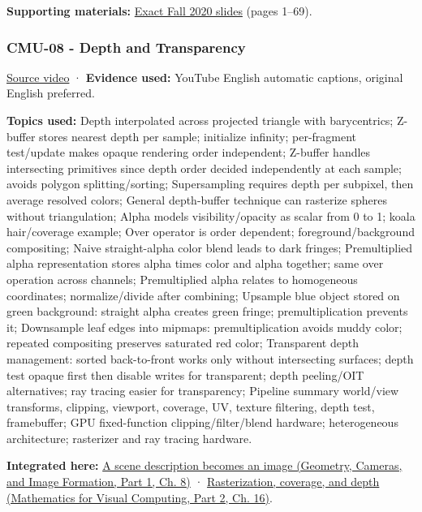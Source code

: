 \textbf{Supporting materials:} \href{https://15462.courses.cs.cmu.edu/fall2020content/lectures/07_texture/07_texture_slides.pdf}{Exact Fall 2020 slides} (pages 1--69).

\subsubsection{CMU-08 - Depth and Transparency}\label{04-visual-computing-ii-ch036-cmu-08---depth-and-transparency}

\hypertarget{04-visual-computing-ii-ch036-cmu-08---depth-and-transparency}{}

\href{https://www.youtube.com/watch?v=WtYfF48Z9mA}{Source video} · \textbf{Evidence used:} YouTube English automatic captions, original English preferred.

\textbf{Topics used:} Depth interpolated across projected triangle with barycentrics; Z-buffer stores nearest depth per sample; initialize infinity; per-fragment test/update makes opaque rendering order independent; Z-buffer handles intersecting primitives since depth order decided independently at each sample; avoids polygon splitting/sorting; Supersampling requires depth per subpixel, then average resolved colors; General depth-buffer technique can rasterize spheres without triangulation; Alpha models visibility/opacity as scalar from 0 to 1; koala hair/coverage example; Over operator is order dependent; foreground/background compositing; Naive straight-alpha color blend leads to dark fringes; Premultiplied alpha representation stores alpha times color and alpha together; same over operation across channels; Premultiplied alpha relates to homogeneous coordinates; normalize/divide after combining; Upsample blue object stored on green background: straight alpha creates green fringe; premultiplication prevents it; Downsample leaf edges into mipmaps: premultiplication avoids muddy color; repeated compositing preserves saturated red color; Transparent depth management: sorted back-to-front works only without intersecting surfaces; depth test opaque first then disable writes for transparent; depth peeling/OIT alternatives; ray tracing easier for transparency; Pipeline summary world/view transforms, clipping, viewport, coverage, UV, texture filtering, depth test, framebuffer; GPU fixed-function clipping/filter/blend hardware; heterogeneous architecture; rasterizer and ray tracing hardware.

\textbf{Integrated here:} \href{../03-Geometry-Cameras-and-Image-Formation-P01/main.pdf\#03-visual-computing-i-ch001-a-scene-description-becomes-an-image}{A scene description becomes an image (Geometry, Cameras, and Image Formation, Part 1, Ch. 8)} · \href{../02-Mathematics-for-Visual-Computing-P02/main.pdf\#03-visual-computing-i-ch012-rasterization-coverage-and-depth}{Rasterization, coverage, and depth (Mathematics for Visual Computing, Part 2, Ch. 16)}.

